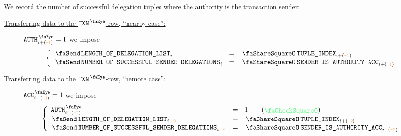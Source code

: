 \begin{center}
\end{center}
We record the number of successful delegation tuples where the authority is the transaction sender:
\begin{description}
	\item[\underline{\underline{Transferring data to the $\peekTransaction$-row, ``nearby case'':}}]
		\If $\peekAuthorization _{i + \roffAuthorizationProcessingPreviousRow} = 1$
		we impose
		\[
			\left\{ \begin{array}{lcl}
				\txLengthOfDelegationList              _{i} & = & \authAuthorizationTupleIndex _{i + \roffAuthorizationProcessingLastAuthorityRowNearby} \\
				\txNumberOfSuccessfulSenderDelegations _{i} & = & \authSenderIsAuthorityAcc    _{i + \roffAuthorizationProcessingLastAuthorityRowNearby} \\
			\end{array} \right.
		\]
	\item[\underline{\underline{Transferring data to the $\peekTransaction$-row, ``remote case'':}}]
		\If $\peekAccount _{i + \roffAuthorizationProcessingPreviousRow} = 1$
		we impose
		\[
			\left\{ \begin{array}{lcl}
				\peekAuthorization                     _{i + \roffAuthorizationProcessingLastAuthorityRowRemote } & = & 1 \qquad (\sanityCheck)                                                                 \\
				\txLengthOfDelegationList              _{i + \roffAuthorizationProcessingFinalTransactionRow    } & = & \authAuthorizationTupleIndex _{i + \roffAuthorizationProcessingLastAuthorityRowRemote } \\
				\txNumberOfSuccessfulSenderDelegations _{i + \roffAuthorizationProcessingFinalTransactionRow    } & = & \authSenderIsAuthorityAcc    _{i + \roffAuthorizationProcessingLastAuthorityRowRemote } \\
			\end{array} \right.
		\]
\end{description}

